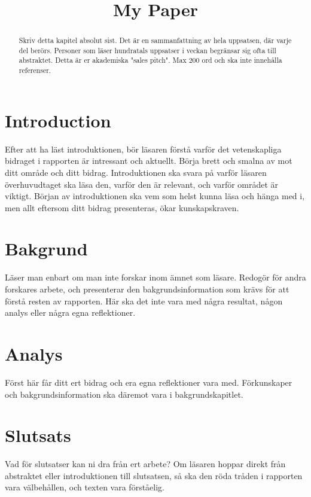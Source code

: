 \documentclass[conference,a4paper]{IEEEtran}
\begin{document}
\title{My Paper}
\author{
}
\maketitle
\begin{abstract}
Skriv detta kapitel absolut sist. Det är en sammanfattning av hela uppsatsen,
där varje del berörs. Personer som läser hundratals uppsatser i veckan begränsar
sig ofta till abstraktet. Detta är er akademiska "sales pitch". Max 200 ord och ska
inte innehålla referenser.
\end{abstract}
\section{Introduction}
Efter att ha läst introduktionen, bör läsaren förstå varför det vetenskapliga
bidraget i rapporten är intressant och aktuellt. Börja brett och smalna av mot ditt
område och ditt bidrag. Introduktionen ska svara på varför läsaren överhuvudtaget
ska läsa den, varför den är relevant, och varför området är viktigt. Början av
introduktionen ska vem som helst kunna läsa och hänga med i, men allt eftersom ditt
bidrag presenteras, ökar kunskapskraven.
\section{Bakgrund}
Läser man enbart om man inte forskar inom ämnet som läsare. Redogör för andra
forskares arbete, och presenterar den bakgrundsinformation som krävs för att förstå
resten av rapporten. Här ska det inte vara med några resultat, någon analys eller
några egna reflektioner.
\section{Analys}
Först här får ditt ert bidrag och era egna reflektioner vara med. Förkunskaper och
bakgrundsinformation ska däremot vara i bakgrundskapitlet.
\section{Slutsats}
Vad för slutsatser kan ni dra från ert arbete? Om läsaren hoppar direkt från
abstraktet eller introduktionen till slutsatsen, så ska den röda tråden i rapporten
vara välbehållen, och texten vara förståelig.
\end{document}
